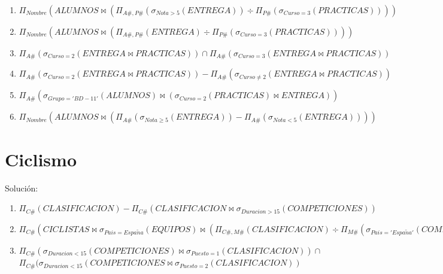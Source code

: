 \documentclass[a4paper]{article}
\begin{document}
\begin{enumerate}
    \item $\Pi_{Nombre} \left( ALUMNOS \bowtie \left( \Pi_{A\#,P\#} \left( \sigma_{Nota>5} \left( ENTREGA \right) \right) \div \Pi_{P\#} \left( \sigma_{Curso=3} \left( PRACTICAS \right) \right) \right) \right)$
    \item $\Pi_{Nombre} \left( ALUMNOS \bowtie \left( \Pi_{A\#,P\#} \left( ENTREGA \right) \div \Pi_{P\#} \left( \sigma_{Curso=3} \left( PRACTICAS \right) \right)\right) \right)$
    \item $\Pi_{A\#} \left( \sigma_{Curso=2} \left( ENTREGA \bowtie PRACTICAS \right) \right) \cap \Pi_{A\#} \left( \sigma_{Curso=3} \left( ENTREGA \bowtie PRACTICAS \right) \right)$
    \item $\Pi_{A\#} \left( \sigma_{Curso=2} \left( ENTREGA \bowtie PRACTICAS \right) \right) - \Pi_{A\#} \left( \sigma_{Curso \neq 2} \left( ENTREGA \bowtie PRACTICAS \right) \right)$
    \item $\Pi_{A\#} \left( \sigma_{Grupo='BD-11'} \left( ALUMNOS \right) \bowtie \left( \sigma_{Curso=2} \left( PRACTICAS \right) \bowtie ENTREGA \right) \right)$
    \item $\Pi_{Nombre} \left( ALUMNOS \bowtie \left( \Pi_{A\#} \left( \sigma_{Nota \geq 5} \left( ENTREGA \right) \right) - \Pi_{A\#} \left( \sigma_{Nota<5} \left( ENTREGA \right) \right) \right) \right)$
\end{enumerate}

\section{Ciclismo}

Solución:

\begin{enumerate}
    \item $\Pi_{C\#} \left( CLASIFICACION \right) - \Pi_{C\#} \left( CLASIFICACION \bowtie \sigma_{Duracion>15} \left( COMPETICIONES \right) \right)$
    \item $\Pi_{C\#} (CICLISTAS \bowtie \sigma_{Pais=Espa\tilde{n}a} (EQUIPOS) \bowtie (\Pi_{C\#,M\#} (CLASIFICACION) \div \Pi_{M\#} (\sigma_{Pais='Espa\tilde{n}a'} (COMPETICIONES))))$
    \item $\Pi_{C\#} (\sigma_{Duracion<15} (COMPETICIONES) \bowtie \sigma_{Puesto=1} (CLASIFICACION)) \cap$ \\
    $\Pi_{C\#} (\sigma_{Duracion<15} (COMPETICIONES \bowtie \sigma_{Puesto=2} (CLASIFICACION))$
\end{enumerate}
\end{document}
